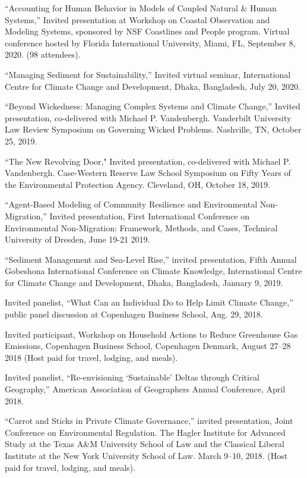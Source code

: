 %
%
\item ``Accounting for Human Behavior in Models of Coupled Natural \& Human Systems,'' Invited presentation at Workshop on Coastal Observation and Modeling Systems, sponsored by NSF Coastlines and People program. Virtual conference hosted by Florida International University, Miami, FL, September 8, 2020. (98 attendees).
\item ``Managing Sediment for Sustainability,'' Invited virtual seminar, International Centre for Climate Change and Development, Dhaka, Bangladesh, July 20, 2020.
\item ``Beyond Wickedness: Managing Complex Systems and Climate Change,'' Invited presentation, co-delivered with Michael P. Vandenbergh. Vanderbilt University Law Review Symposium on Governing Wicked Problems. Nashville, TN, October 25, 2019.
\item ``The New Revolving Door," Invited presentation, co-delivered with Michael P. Vandenbergh. Case-Western Reserve Law School Symposium on Fifty Years of the Environmental Protection Agency. Cleveland, OH, October 18, 2019.
\item ``Agent-Based Modeling of Community Resilience and Environmental Non-Migration,'' Invited presentation, First International Conference on Environmental Non-Migration: Framework, Methods, and Cases, Technical University of Dresden, June 19-21 2019.
\item ``Sediment Management and Sea-Level Rise,'' invited presentation, Fifth Annual Gobeshona International Conference on Climate Knowledge, International Centre for Climate Change and Development, Dhaka, Bangladesh, January 9, 2019.
\item Invited panelist, ``What Can an Individual Do to Help Limit Climate Change,'' public panel discussion at Copenhagen Business School, Aug. 29, 2018.
\item Invited participant, Workshop on Household Actions to Reduce Greenhouse Gas Emissions, Copenhagen Business School, Copenhagen Denmark, August 27--28 2018 (Host paid for travel, lodging, and meals).
\item Invited panelist, ``Re-envisioning `Sustainable' Deltas through Critical Geography,'' American Association of Geographers Annual Conference, April 2018.
\item ``Carrot and Sticks in Private Climate Governance,'' invited presentation, Joint Conference on Environmental Regulation. The Hagler Institute for Advanced Study at the Texas A\&M University School of Law and the Classical Liberal Institute at the New York University School of Law. March 9--10, 2018. (Host paid for travel, lodging, and meals).
